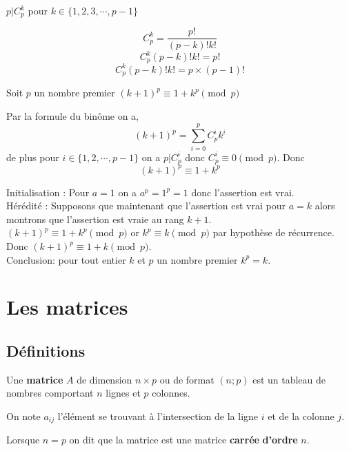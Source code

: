\documentclass[french]{book}
\begin{document}
\begin{lemme}
$p\vert C^k_p$ pour $k\in \{1,2,3,\cdots, p-1 \}$\\
\end{lemme}

\begin{demo}

$$C^k_p=\dfrac{p!}{(p-k)!k!}$$ 
$$C^k_p(p-k)!k!=p! $$
$$C^k_p(p-k)!k!=p\times (p-1)!$$

\end{demo}

\begin{lemme}
Soit $p$ un nombre premier $(k+1)^p \equiv 1+k^p \pmod p$
\end{lemme}

\begin{demo}
Par la formule du binôme on a,
$$(k+1)^p=\sum_{i=0}^p C^i_pk^i$$
de plus pour $i \in \{1,2,\cdots,p-1\}$ on a $p\vert C^i_p$ donc $ C^i_p\equiv 0 \pmod p$. 
Donc 
$$(k+1)^p \equiv 1+k^p$$
\end{demo}

\begin{demo}
Initialisation : Pour $a=1$ on a $a^p=1^p=1$ donc l'assertion est vrai. \\

Hérédité : Supposons que maintenant que l'assertion est vrai pour $a=k$ alors montrons que l'assertion est vraie au rang $k+1$.\\

$(k+1)^p \equiv 1+k^p \pmod p$ or $k^p \equiv k \pmod p$ par hypothèse de récurrence. Donc $(k+1)^p \equiv 1+k \pmod p$.\\

Conclusion: pour tout entier $k$ et $p$ un nombre premier $k^p=k$.

\end{demo}


\chapter{Les matrices}

 \section{Définitions}

\begin{defn}
Une \textbf{matrice} $A$ de dimension $n\times p$ ou de format $(n;p)$ est un tableau de nombres comportant $n$ lignes et $p$ colonnes.
   
   On note $a_{ij}$ l'élément se trouvant à l'intersection de la ligne $i$ et de la colonne $j$.
   
   Lorsque $n=p$ on dit que la matrice est une matrice \textbf{carrée} \textbf{d'ordre} $n$.
   
\end{defn} 
\end{document}
